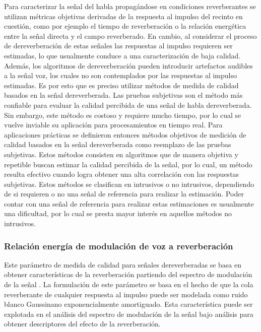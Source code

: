 Para caracterizar la señal del habla propagándose en condiciones reverberantes se utilizan métricas objetivas derivadas de la respuesta al impulso del recinto en cuestión, como por ejemplo el tiempo de reverberación o la relación energética entre la señal directa y el campo reverberado. En cambio, al considerar el proceso de dereverberación de estas señales las respuestas al impulso requieren ser estimadas, lo que usualmente conduce a una caracterización de baja calidad. Además, los algoritmos de dereverberación pueden introducir artefactos audibles a la señal voz, los cuales no son contemplados por las respuestas al impulso estimadas. Es por esto que es preciso utilizar métodos de medida de calidad basados en la señal dereverberada. Las pruebas subjetivas son el método más confiable para evaluar la calidad percibida de una señal de habla dereverberada. Sin embargo, este método es costoso y requiere mucho tiempo, por lo cual se vuelve inviable su aplicación para procesamientos en tiempo real. Para aplicaciones prácticas se definieron entonces métodos objetivos de medición de calidad basados en la señal dereverberada como reemplazo de las pruebas subjetivas. Estos métodos consisten en algoritmos que de manera objetiva y repetible buscan estimar la calidad percibida de la señal, por lo cual, un método resulta efectivo cuando logra obtener una alta correlación con las respuestas subjetivas. Estos métodos se clasifican en intrusivos o no intrusivos, dependiendo de si requieren o no una señal de referencia para realizar la estimación. Poder contar con una señal de referencia para realizar estas estimaciones es usualmente una dificultad, por lo cual se presta mayor interés en aquellos métodos no intrusivos. 

\subsubsection{Relación energía de modulación de voz a reverberación}

Este parámetro de medida de calidad para señales dereverberadas se basa en obtener características de la reverberación partiendo del espectro de modulación de la señal \cite{SRMR}. La formulación de este parámetro se basa en el hecho de que la cola reverberante de cualquier respuesta al impulso puede ser modelada como ruido blanco Gaussinano exponencialmente amortiguado. Esta característica puede ser explotada en el análisis del espectro de modulación de la señal bajo análisis para obtener descriptores del efecto de la reverberación.

